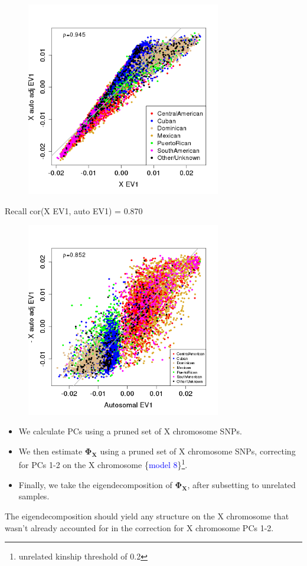 \documentclass{beamer}
\begin{document}
\begin{frame}
\begin{figure}
\includegraphics[height=8.5cm]{../eigen_unrel_adjXkc_adjAutoPC15_xPrunedKC_ev1vsPCA_prunedX.png}
\end{figure}
\end{frame}

\begin{frame}
\footnotesize Recall cor(X EV1, auto EV1) = 0.870
\begin{figure}
\includegraphics[height=8.5cm]{../eigen_unrel_adjXkc_adjAutoPC15_xPrunedKC_ev1vsPCA_auto.png}
\end{figure}
\end{frame}


\begin{frame}
\begin{itemize}
\item We calculate PCs using a pruned set of X chromosome SNPs.
\item We then estimate $\mathbf{\Phi_X}$ using a pruned set of X chromosome SNPs, correcting for PCs 1-2 on the X chromosome \{\textcolor{blue}{model 8}\}\footnote{unrelated kinship threshold of 0.2}.
\item Finally, we take the eigendecomposition of $\mathbf{\Phi_X}$, after subsetting to unrelated samples.
\end{itemize}
The eigendecomposition should yield any structure on the X chromosome that wasn't already accounted for in the correction for X chromosome PCs 1-2.
\end{frame}
\end{document}
